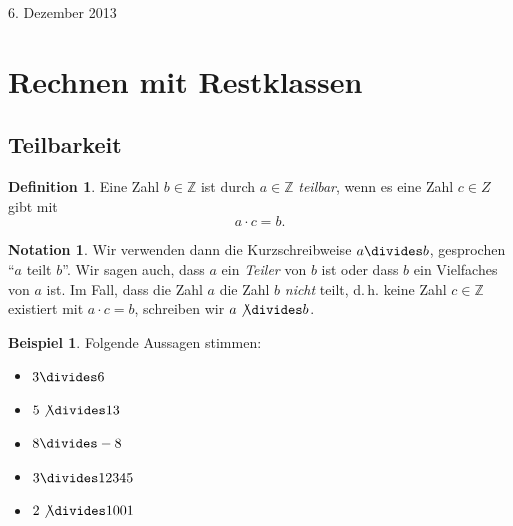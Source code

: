\documentclass[a4paper,ngerman,12pt]{scrartcl}
\newcommand{\Z}{\mathbb{Z}}
\newcommand{\datum}[1]{\hfill {#1}\\}
\theoremstyle{definition}
\newtheorem{defn}{Definition}
\newtheorem*{nota}{Notation}
\newtheorem*{bsp}{Beispiel}
\begin{document}


\datum{6. Dezember 2013}

\section{Rechnen mit Restklassen}

\subsection{Teilbarkeit}

\begin{defn}
  Eine Zahl $b \in \Z$ ist durch $a \in \Z$ \emph{teilbar}, wenn es eine Zahl $c \in Z$ gibt mit
  \[ a \cdot c = b. \]
\end{defn}

\begin{nota}
  Wir verwenden dann die Kurzschreibweise $a \divides b$, gesprochen "`$a$ teilt $b$"'. Wir sagen auch, dass $a$ ein \emph{Teiler} von $b$ ist oder dass $b$ ein Vielfaches von $a$ ist. Im Fall, dass die Zahl $a$ die Zahl $b$ \emph{nicht} teilt, d.\,h. keine Zahl $c \in \Z$ existiert mit $a \cdot c = b$, schreiben wir $a \not\divides b$.
\end{nota}

\begin{bsp}
  Folgende Aussagen stimmen:
  \begin{multicols}{5}
    \begin{itemize}
      \item $3 \divides 6$
      \item $5 \not\divides 13$
      \item $8 \divides -8$
      \item $3 \divides 12345$
      \item $2 \not\divides 1001$
    \end{itemize}
  \end{multicols}
\end{bsp}
\end{document}
